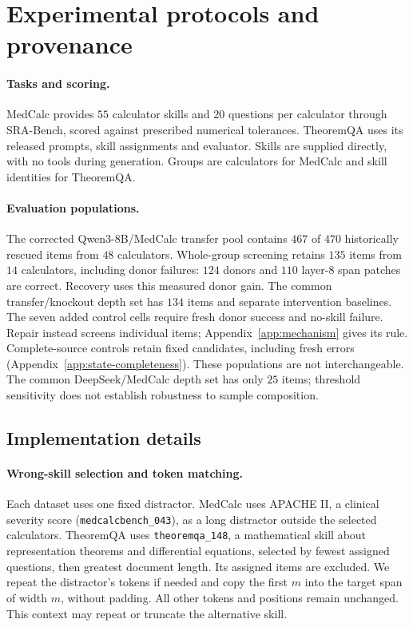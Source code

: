 \section{Experimental protocols and provenance}
\label{app:setup}

\paragraph{Tasks and scoring.}
MedCalc provides $55$ calculator skills and $20$ questions per calculator
through SRA-Bench, scored against prescribed numerical tolerances.
TheoremQA uses its released prompts, skill assignments and evaluator.
Skills are supplied directly, with no tools during generation.
Groups are calculators for MedCalc and skill identities for TheoremQA.

\paragraph{Evaluation populations.}
The corrected Qwen3-8B/MedCalc transfer pool contains $467$ of $470$
historically rescued items from $48$ calculators. Whole-group screening
retains $135$ items from $14$ calculators, including donor failures:
$124$ donors and $110$ layer-$8$ span patches are correct. Recovery uses
this measured donor gain. The common transfer/knockout depth set has $134$
items and separate intervention baselines. The seven added control cells
require fresh donor success and no-skill failure. Repair instead screens
individual items; Appendix~\ref{app:mechanism} gives its rule.
Complete-source controls retain fixed candidates, including fresh errors
(Appendix~\ref{app:state-completeness}). These populations are not interchangeable.
The common DeepSeek/MedCalc depth set has only $25$ items; threshold
sensitivity does not establish robustness to sample composition.

\subsection{Implementation details}
\label{app:detail}

\paragraph{Wrong-skill selection and token matching.}
Each dataset uses one fixed distractor. MedCalc uses APACHE II, a clinical
severity score (\texttt{medcalcbench\_043}), as a long distractor outside the
selected calculators. TheoremQA uses
\texttt{theoremqa\_148}, a mathematical skill about representation theorems
and differential equations, selected by fewest assigned questions, then
greatest document length. Its assigned items are excluded.
We repeat the distractor's tokens if needed and copy the first $m$ into
the target span of width $m$, without padding. All other tokens and
positions remain unchanged. This context may repeat or truncate the
alternative skill.

